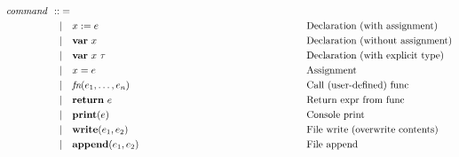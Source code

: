 \begin{fleqn}
        \begin{align*}
                 & \textit{command} \hspace{-0.1cm} & :: & =                                     &  &                                                        \\
                 & \hspace{-0.1cm}                  &    & | \ \ \ x := e                        &  & \hspace*{5.6cm}\text{Declaration (with assignment)}    \\
                 & \hspace{-0.1cm}                  &    & | \ \ \ \textbf{var} \ x              &  & \hspace*{5.6cm}\text{Declaration (without assignment)} \\
                 & \hspace{-0.1cm}                  &    & | \ \ \ \textbf{var} \ x \ \tau       &  & \hspace*{5.6cm}\text{Declaration (with explicit type)} \\
                 & \hspace{-0.1cm}                  &    & | \ \ \ x = e                         &  & \hspace*{5.6cm}\text{Assignment}                       \\
                 & \hspace{-0.1cm}                  &    & | \ \ \ \textit{fn}(e_1, \ldots, e_n) &  & \hspace*{5.6cm}\text{Call (user-defined) func}         \\
                 & \hspace{-0.1cm}                  &    & | \ \ \ \textbf{return} \ e           &  & \hspace*{5.6cm}\text{Return expr from func}            \\
                 &                                  &    & | \ \ \ \textbf{print}(e)             &  & \hspace*{5.6cm}\text{Console print}                    \\
                 &                                  &    & | \ \ \ \textbf{write}(e_1, e_2)      &  & \hspace*{5.6cm}\text{File write (overwrite contents)}  \\
                 &                                  &    & | \ \ \ \textbf{append}(e_1, e_2)     &  & \hspace*{5.6cm}\text{File append}                      \\

\end{align*}
\end{fleqn}
